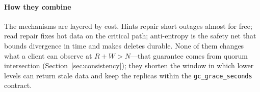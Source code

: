 \paragraph{How they combine}
The mechanisms are layered by cost. Hints repair short outages almost for free; read repair
fixes hot data on the critical path; anti-entropy is the safety net that bounds divergence in
time and makes deletes durable. None of them changes what a client can observe at
$R + W > N$---that guarantee comes from quorum intersection
(Section~\ref{sec:consistency}); they shorten the window in which lower levels can return
stale data and keep the replicas within the \texttt{gc\_grace\_seconds} contract.
